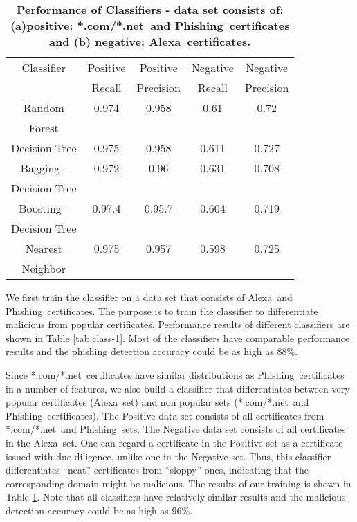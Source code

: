 \documentclass[twocolumn]{article}
\newcommand{\Alexa}{\textsf{Alexa}}
\newcommand{\phishing}{\textsf{Phishing}}
\newcommand{\comnet}{\textsf{*.com/*.net}}
\begin{document}
\begin{table}[t]
\centering
{\footnotesize
\begin{tabular}{|c|c|c|c|c|}
\hline

Classifier & Positive & Positive & Negative & Negative\\
        & Recall & Precision & Recall & Precision\\
\hline
Random & 0.974 & 0.958 & 0.61  & 0.72\\
Forest &&&&\\
\hline
Decision Tree  & 0.975 &  0.958 & 0.611  & 0.727\\
\hline
Bagging - & 0.972 & 0.96 & 0.631  & 0.708 \\
Decision Tree  & & &  & \\
\hline
Boosting - & 0.97.4 & 0.95.7 & 0.604   &0.719 \\
Decision Tree  & & &  & \\
\hline
Nearest  & 0.975  & 0.957  & 0.598  & 0.725 \\
Neighbor&&&&\\
\hline
\end{tabular}
}
\vspace{-0.1cm}
\caption{\bf Performance of Classifiers - data set consists of: (a)positive: \comnet\ and \phishing\  certificates
 and (b) negative: \Alexa\  certificates.}
\label{tab:class-2}
\end{table}

We first train the classifier on a data set that consists of \Alexa\ and \phishing\ certificates. The purpose is to train the
classifier to differentiate malicious from popular certificates. Performance results of different
classifiers are shown in Table \ref{tab:class-1}. Most of the classifiers have comparable performance results and the phishing detection accuracy could be as high as 88\%.

Since \comnet\ certificates have similar distributions as \phishing\ certificates in a number of features, we also build a classifier that differentiates between 
very popular certificates (\Alexa\ set) and non popular sets (\comnet\ and \phishing\ certificates). The Positive data set consists of all 
certificates from \comnet\ and \phishing\ sets. The Negative data set consists of all certificates in the \Alexa\ set. 
One can regard a certificate in the Positive set as a certificate issued with due diligence, unlike
one in the Negative set. Thus, this classifier differentiates ``neat'' certificates from ``sloppy'' ones, indicating that the corresponding
domain might be malicious. The results of our training is shown in Table \ref{tab:class-2}. Note that all classifiers have relatively similar results and the malicious detection accuracy could be as high as 96\%. 
\end{document}
